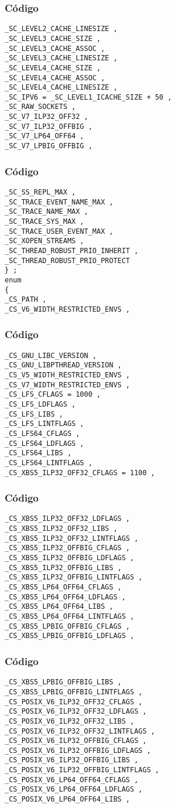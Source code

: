 \documentclass{beamer}
\begin{document}
\begin{frame}[fragile]
\frametitle{C\'odigo}
\begin{verbatim}
_SC_LEVEL2_CACHE_LINESIZE , 
_SC_LEVEL3_CACHE_SIZE , 
_SC_LEVEL3_CACHE_ASSOC , 
_SC_LEVEL3_CACHE_LINESIZE , 
_SC_LEVEL4_CACHE_SIZE , 
_SC_LEVEL4_CACHE_ASSOC , 
_SC_LEVEL4_CACHE_LINESIZE , 
_SC_IPV6 = _SC_LEVEL1_ICACHE_SIZE + 50 , 
_SC_RAW_SOCKETS , 
_SC_V7_ILP32_OFF32 , 
_SC_V7_ILP32_OFFBIG , 
_SC_V7_LP64_OFF64 , 
_SC_V7_LPBIG_OFFBIG , 
\end{verbatim}
\end{frame}
\begin{frame}[fragile]
\frametitle{C\'odigo}
\begin{verbatim}
_SC_SS_REPL_MAX , 
_SC_TRACE_EVENT_NAME_MAX , 
_SC_TRACE_NAME_MAX , 
_SC_TRACE_SYS_MAX , 
_SC_TRACE_USER_EVENT_MAX , 
_SC_XOPEN_STREAMS , 
_SC_THREAD_ROBUST_PRIO_INHERIT , 
_SC_THREAD_ROBUST_PRIO_PROTECT 
} ; 
enum 
{ 
_CS_PATH , 
_CS_V6_WIDTH_RESTRICTED_ENVS , 
\end{verbatim}
\end{frame}
\begin{frame}[fragile]
\frametitle{C\'odigo}
\begin{verbatim}
_CS_GNU_LIBC_VERSION , 
_CS_GNU_LIBPTHREAD_VERSION , 
_CS_V5_WIDTH_RESTRICTED_ENVS , 
_CS_V7_WIDTH_RESTRICTED_ENVS , 
_CS_LFS_CFLAGS = 1000 , 
_CS_LFS_LDFLAGS , 
_CS_LFS_LIBS , 
_CS_LFS_LINTFLAGS , 
_CS_LFS64_CFLAGS , 
_CS_LFS64_LDFLAGS , 
_CS_LFS64_LIBS , 
_CS_LFS64_LINTFLAGS , 
_CS_XBS5_ILP32_OFF32_CFLAGS = 1100 , 
\end{verbatim}
\end{frame}
\begin{frame}[fragile]
\frametitle{C\'odigo}
\begin{verbatim}
_CS_XBS5_ILP32_OFF32_LDFLAGS , 
_CS_XBS5_ILP32_OFF32_LIBS , 
_CS_XBS5_ILP32_OFF32_LINTFLAGS , 
_CS_XBS5_ILP32_OFFBIG_CFLAGS , 
_CS_XBS5_ILP32_OFFBIG_LDFLAGS , 
_CS_XBS5_ILP32_OFFBIG_LIBS , 
_CS_XBS5_ILP32_OFFBIG_LINTFLAGS , 
_CS_XBS5_LP64_OFF64_CFLAGS , 
_CS_XBS5_LP64_OFF64_LDFLAGS , 
_CS_XBS5_LP64_OFF64_LIBS , 
_CS_XBS5_LP64_OFF64_LINTFLAGS , 
_CS_XBS5_LPBIG_OFFBIG_CFLAGS , 
_CS_XBS5_LPBIG_OFFBIG_LDFLAGS , 
\end{verbatim}
\end{frame}
\begin{frame}[fragile]
\frametitle{C\'odigo}
\begin{verbatim}
_CS_XBS5_LPBIG_OFFBIG_LIBS , 
_CS_XBS5_LPBIG_OFFBIG_LINTFLAGS , 
_CS_POSIX_V6_ILP32_OFF32_CFLAGS , 
_CS_POSIX_V6_ILP32_OFF32_LDFLAGS , 
_CS_POSIX_V6_ILP32_OFF32_LIBS , 
_CS_POSIX_V6_ILP32_OFF32_LINTFLAGS , 
_CS_POSIX_V6_ILP32_OFFBIG_CFLAGS , 
_CS_POSIX_V6_ILP32_OFFBIG_LDFLAGS , 
_CS_POSIX_V6_ILP32_OFFBIG_LIBS , 
_CS_POSIX_V6_ILP32_OFFBIG_LINTFLAGS , 
_CS_POSIX_V6_LP64_OFF64_CFLAGS , 
_CS_POSIX_V6_LP64_OFF64_LDFLAGS , 
_CS_POSIX_V6_LP64_OFF64_LIBS , 
\end{verbatim}
\end{frame}
\end{document}
